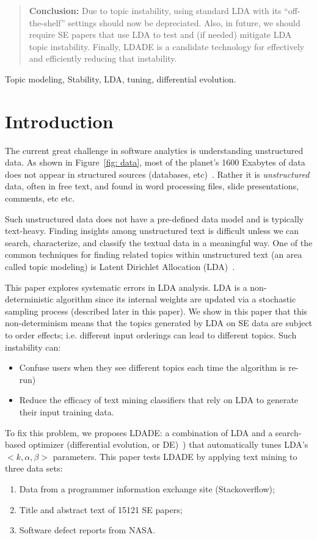 \documentclass[twocolumn,5p,sort&compress]{elsarticle}
\newcommand{\bi}{\begin{itemize}}
\newcommand{\ei}{\end{itemize}}
\newcommand{\be}{\begin{enumerate}}
\newcommand{\ee}{\end{enumerate}}
\theoremstyle{break}
\begin{document}
\begin{frontmatter}
\begin{abstract}
\noindent
\textbf{Conclusion:}
  Due to topic instability,
  using standard LDA with its ``off-the-shelf'' settings should now be depreciated.
  Also, in future,
we should require
SE
papers that use
LDA
to
test and (if needed) mitigate LDA topic instability.
  Finally, LDADE is a candidate technology for effectively and efficiently reducing that instability.  
\end{abstract}

\begin{keyword}
Topic modeling, Stability, LDA, tuning, differential evolution.
\end{keyword}

\end{frontmatter}



\section{Introduction}
\label{sect:intro} 

The current great challenge in software analytics
is understanding unstructured data. As shown in Figure~\ref{fig:
data}, most of the planet's 1600 Exabytes of data does not appear
in structured sources (databases, etc)~\cite{nadkarni2014structured}.
Rather it is {\em unstructured} data, often in free text, and found
in word processing files, slide presentations, comments, etc etc.

Such unstructured data does not have a pre-defined data model and
is typically text-heavy. Finding insights among unstructured text
is  difficult unless we can search, characterize, and classify the
textual data in a meaningful way. One of the common techniques for
finding related topics within unstructured text (an area called
topic modeling) is Latent Dirichlet Allocation (LDA)~\cite{blei2003latent}.

This paper explores systematic errors in LDA analysis.
LDA is a non-deterministic algorithm since its internal weights are updated via a stochastic sampling process (described
later in this paper).
We show in this paper that this non-determinism means that the  topics generated by LDA on
SE data are subject to order effects; i.e. different input orderings
can lead to different topics.
Such instability can:
\bi
\item
  Confuse users when they see different topics each time
the algorithm is re-run) 
\item
  Reduce the efficacy of text mining classifiers that rely on LDA to
  generate their input training data.
\ei
To fix this problem,
we proposes LDADE: a  combination of LDA and a search-based optimizer (differential evolution, or DE)~\cite{storn1997differential})
that automatically tunes LDA's \mbox{$<k,\alpha,\beta>$} parameters. This paper tests LDADE 
by applying text mining to
three data sets:
\be
\item Data from a programmer information exchange site (Stackoverflow);
  \item Title and abstract text of
    15121 SE papers;
  \item Software defect reports from NASA.
\ee
    
\end{document}
